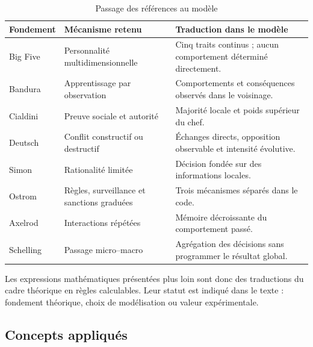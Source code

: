 \documentclass[10pt,a4paper]{article}
\begin{document}
\begin{table}[H]
\centering
\caption{Passage des références au modèle}
\begin{tabularx}{\textwidth}{@{}L{34mm}L{42mm}Y@{}}
\toprule
{}
\color{white}\textbf{Fondement} &
\color{white}\textbf{Mécanisme retenu} &
\color{white}\textbf{Traduction dans le modèle}\\
\midrule
Big Five \cite{costa1992} &
Personnalité multidimensionnelle &
Cinq traits continus ; aucun comportement déterminé directement.\\
Bandura \cite{bandura1977} &
Apprentissage par observation &
Comportements et conséquences observés dans le voisinage.\\
Cialdini \cite{cialdini2009} &
Preuve sociale et autorité &
Majorité locale et poids supérieur du chef.\\
Deutsch \cite{deutsch1973} &
Conflit constructif ou destructif &
Échanges directs, opposition observable et intensité évolutive.\\
Simon \cite{simon1997} &
Rationalité limitée &
Décision fondée sur des informations locales.\\
Ostrom \cite{ostrom1990} &
Règles, surveillance et sanctions graduées &
Trois mécanismes séparés dans le code.\\
Axelrod \cite{axelrod2006} &
Interactions répétées &
Mémoire décroissante du comportement passé.\\
Schelling \cite{schelling2006} &
Passage micro--macro &
Agrégation des décisions sans programmer le résultat global.\\
\bottomrule
\end{tabularx}
\end{table}

Les expressions mathématiques présentées plus loin sont donc des traductions
du cadre théorique en règles calculables. Leur statut est indiqué dans le
texte : fondement théorique, choix de modélisation ou valeur expérimentale.

\subsection{Concepts appliqués}
\end{document}
